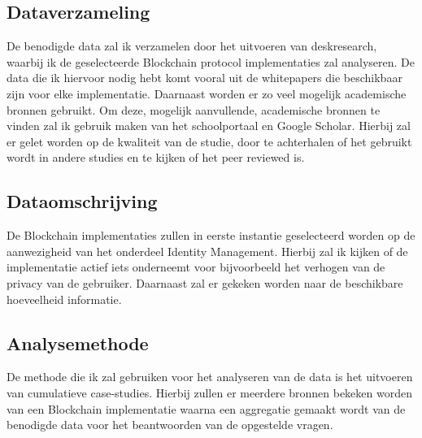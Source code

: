 \subsection{Dataverzameling}

De benodigde data zal ik verzamelen door het uitvoeren van deskresearch, waarbij ik de geselecteerde Blockchain protocol implementaties zal analyseren. De data die ik hiervoor nodig hebt komt vooral uit de whitepapers die beschikbaar zijn voor elke implementatie. Daarnaast worden er zo veel mogelijk academische bronnen gebruikt. Om deze, mogelijk aanvullende, academische bronnen te vinden zal ik gebruik maken van het schoolportaal en Google Scholar. Hierbij zal er gelet worden op de kwaliteit van de studie, door te achterhalen of het gebruikt wordt in andere studies en te kijken of het peer reviewed is.

\subsection{Dataomschrijving}

De Blockchain implementaties zullen in eerste instantie geselecteerd worden op de aanwezigheid van het onderdeel Identity Management. Hierbij zal ik kijken of de implementatie actief iets onderneemt voor bijvoorbeeld het verhogen van de privacy van de gebruiker. Daarnaast zal er gekeken worden naar de beschikbare hoeveelheid informatie.

\subsection{Analysemethode}

De methode die ik zal gebruiken voor het analyseren van de data is het uitvoeren van cumulatieve case-studies. Hierbij zullen er meerdere bronnen bekeken worden van een Blockchain implementatie waarna een aggregatie gemaakt wordt van de benodigde data voor het beantwoorden van de opgestelde vragen.